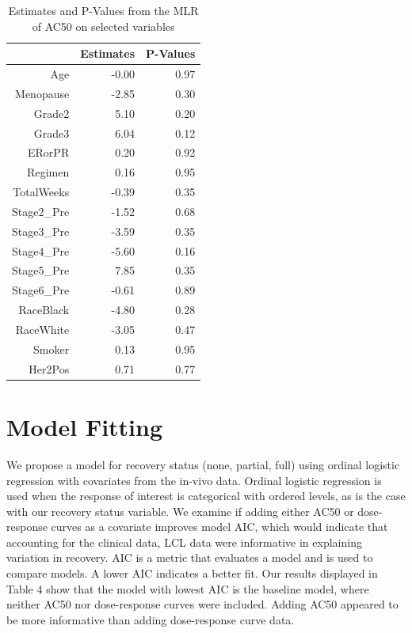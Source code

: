 \documentclass[12pt]{article}
\begin{document}
\begin{table}[ht]
\caption{Estimates and P-Values from the MLR of AC50 on selected variables}
\centering
\begin{tabular}{rrr}
  \hline
 & Estimates & P-Values \\ 
  \hline
Age & -0.00 & 0.97 \\ 
  Menopause & -2.85 & 0.30 \\ 
  Grade2 & 5.10 & 0.20 \\ 
  Grade3 & 6.04 & 0.12 \\ 
  ERorPR & 0.20 & 0.92 \\ 
  Regimen & 0.16 & 0.95 \\ 
  TotalWeeks & -0.39 & 0.35 \\ 
  Stage2\_Pre & -1.52 & 0.68 \\ 
  Stage3\_Pre & -3.59 & 0.35 \\ 
  Stage4\_Pre & -5.60 & 0.16 \\ 
  Stage5\_Pre & 7.85 & 0.35 \\ 
  Stage6\_Pre & -0.61 & 0.89 \\ 
  RaceBlack & -4.80 & 0.28 \\ 
  RaceWhite & -3.05 & 0.47 \\ 
  Smoker & 0.13 & 0.95 \\ 
  Her2Pos & 0.71 & 0.77 \\ 
   \hline
\end{tabular}
\end{table}

\section{Model Fitting}

We propose a model for recovery status (none, partial, full) using ordinal logistic regression with covariates from the in-vivo data. Ordinal logistic regression is used when the response of interest is categorical with ordered levels, as is the case with our recovery status variable. We examine if adding either AC50 or dose-response curves as a covariate improves model AIC, which would indicate that accounting for the clinical data, LCL data were informative in explaining variation in recovery. AIC is a metric that evaluates a model and is used to compare models. A lower AIC indicates a better fit. Our results displayed in Table 4 show that the model with lowest AIC is the baseline model, where neither AC50 nor dose-response curves were included. Adding AC50 appeared to be more informative than adding dose-response curve data. 
\end{document}
